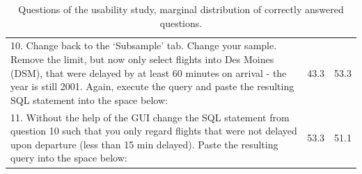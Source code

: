 \documentclass[11pt]{tise_style}
\begin{document}
\begin{table}[htbp]
\begin{tabular}{p{4.5in}rr}
\footnotesize 10. Change back to the `Subsample' tab.  Change your sample. Remove the limit, but now only select flights into Des Moines (DSM), that were delayed by at least 60 minutes on arrival - the year is still 2001.  Again, execute the query and paste the resulting SQL statement into the space below: & \footnotesize 43.3 & \footnotesize 53.3 \\
\footnotesize 11. Without the help of the GUI change the SQL statement from question 10 such that you only regard flights that were not delayed upon departure (less than 15 min delayed).  Paste the resulting query into the space below: & \footnotesize 53.3 & \footnotesize 51.1 \\ 
      \bottomrule
   \end{tabular}
   \caption{Questions of the usability study, marginal distribution of correctly answered questions.}
   \label{fb-questions}
\end{table}
\label{implement}
%

\end{document}
